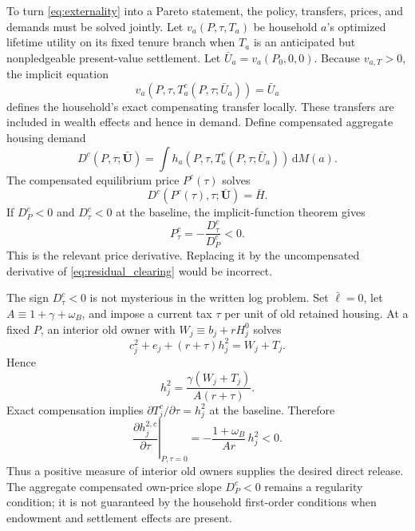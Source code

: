 \documentclass[11pt]{article}
\newcommand{\dd}{\mathrm d}
\newcommand{\1}{\mathbf 1}
\newcommand{\ellbar}{\bar\ell}
\begin{document}
To turn \eqref{eq:externality} into a Pareto statement, the policy, transfers,
prices, and demands must be solved jointly. Let $v_a(P,\tau,T_a)$ be household
$a$'s optimized lifetime utility on its fixed tenure branch when $T_a$ is an
anticipated but nonpledgeable present-value settlement. Let
$\bar U_a=v_a(P_0,0,0)$. Because $v_{a,T}>0$, the implicit equation
\begin{equation}
v_a\!\left(P,\tau,T_a^c(P,\tau;\bar U_a)\right)=\bar U_a
\label{eq:exact_cv}
\end{equation}
defines the household's exact compensating transfer locally. These transfers
are included in wealth effects and hence in demand. Define compensated
aggregate housing demand
\begin{equation}
D^c(P,\tau;\bar{\mathbf U})
=\int h_a\!\left(P,\tau,T_a^c(P,\tau;\bar U_a)\right)\,\dd M(a).
\label{eq:compensated_demand}
\end{equation}
The compensated equilibrium price $P^c(\tau)$ solves
\begin{equation}
D^c(P^c(\tau),\tau;\bar{\mathbf U})=\bar H.
\label{eq:compensated_clearing}
\end{equation}
If $D_P^c<0$ and $D_\tau^c<0$ at the baseline, the implicit-function theorem
gives
\begin{equation}
\boxed{
P_\tau^c=-\frac{D_\tau^c}{D_P^c}<0.}
\label{eq:Ptauc}
\end{equation}
This is the relevant price derivative. Replacing it by the uncompensated
derivative of \eqref{eq:residual_clearing} would be incorrect.

The sign $D_\tau^c<0$ is not mysterious in the written log problem. Set
$\ellbar=0$, let $A\equiv1+\gamma+\omega_B$, and impose a current tax $\tau$
per unit of old retained housing. At a fixed $P$, an interior old owner with
$W_j\equiv b_j+rH_j^0$ solves
\begin{equation}
c_j^2+e_j+(r+\tau)h_j^2=W_j+T_j.
\end{equation}
Hence
\begin{equation}
h_j^2=\frac{\gamma(W_j+T_j)}{A(r+\tau)}.
\end{equation}
Exact compensation implies
$\partial T_j^c/\partial\tau=h_j^2$ at the baseline. Therefore
\begin{equation}
\left.\frac{\partial h_j^{2,c}}{\partial\tau}\right|_{P,\tau=0}
=-\frac{1+\omega_B}{Ar}\,h_j^2<0.
\label{eq:old_compensated_release}
\end{equation}
Thus a positive measure of interior old owners supplies the desired direct
release. The aggregate compensated own-price slope $D_P^c<0$ remains a
regularity condition; it is not guaranteed by the household first-order
conditions when endowment and settlement effects are present.
\end{document}
